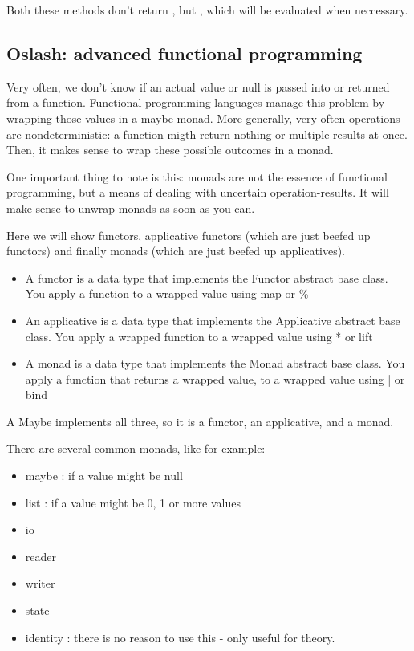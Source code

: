 Both these methods don't return \inlinecode{[1, 2, 4, ..., n**2]}, but , which will be evaluated when neccessary.


\subsection{Oslash: advanced functional programming}

Very often, we don't know if an actual value or null is passed into or returned from a function. Functional programming languages manage this problem by wrapping those values in a maybe-monad. More generally, very often operations are nondeterministic: a function migth return nothing or multiple results at once. Then, it makes sense to wrap these possible outcomes in a monad. 


One important thing to note is this: monads are not the essence of functional programming, but a means of dealing with uncertain operation-results. It will make sense to unwrap monads as soon as you can.


Here we will show functors, applicative functors (which are just beefed up functors) and finally monads (which are just beefed up applicatives). 

\begin{itemize}
    \item A functor is a data type that implements the Functor abstract base class. You apply a function to a wrapped value using map or \% 
    \item An applicative is a data type that implements the Applicative abstract base class. You apply a wrapped function to a wrapped value using * or lift
    \item A monad is a data type that implements the Monad abstract base class.  You apply a function that returns a wrapped value, to a wrapped value using | or bind
\end{itemize}

A Maybe implements all three, so it is a functor, an applicative, and a monad.

There are several common monads, like for example: 

\begin{itemize}
    \item maybe : if a value might be null
    \item list : if a value might be 0, 1 or more values
    \item io
    \item reader
    \item writer
    \item state
    \item identity : there is no reason to use this - only useful for theory.
\end{itemize}

